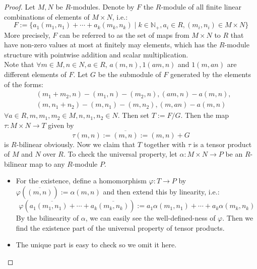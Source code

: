 \begin{proof}
    Let $M,N$ be $R$-modules. Denote by $F$ the $R$-module of all finite linear combinations of elements of $M\times N$, i.e.:
    $$F:= \{ a_1 (m_1,n_1) +\cdots+ a_k(m_k,n_k) \mid k \in \mathbb{N}_+,a_i\in R, (m_i,n_i) \in M \times N\}$$
    More precisely, $F$ can be referred to as the set of maps from $M\times N$ to $R$ that have non-zero values at most at finitely may elements, which has the $R$-module structure with pointwise addition and scalar multiplication.\\
    Note that $\forall m\in M,n\in N,a\in R$, $a(m,n),1(am,n)$ and $1(m,an)$ are different elements of $F$. Let $G$ be the submodule of $F$ generated by the elements of the forms:
    \begin{align*}
        &(m_1+m_2,n) - (m_1,n) -(m_2,n), (am,n)-a(m,n),\\
        &(m,n_1+n_2) - (m,n_1) -(m,n_2), (m,an)-a(m,n)
    \end{align*}
    $\forall a\in R,m,m_1,m_2 \in M, n,n_1,n_2\in N$. Then set $T:= F/G$. Then the map $\tau:M\times N \to T$ given by
    $$\tau(m,n) := \overline{(m,n)} := (m,n) +G $$
    is $R$-bilinear obviously. Now we claim that $T$ together with $\tau$ is a tensor product of $M$ and $N$ over $R$. To check the universal property, let $\alpha: M\times N \to P$ be an $R$-bilinear map to any $R$-module $P$. 
    \begin{itemize}
        \item For the existence, define a homomorphism $\varphi: T\to P$ by
        $\varphi (\overline{(m,n)}) := \alpha(m,n)$
        and then extend this by linearity, i.e.:
        $$\varphi (a_1\overline{(m_1,n_1)} + \cdots + a_k\overline{(m_k,n_k)}) := a_1\alpha(m_1,n_1) +\cdots+ a_k\alpha(m_k,n_k)$$
        By the bilinearity of $\alpha$, we can easily see the well-defined-ness of $\varphi$. Then we find the existence part of the universal property of tensor products.

        \item The unique part is easy to check so we omit it here.
    \end{itemize}
\end{proof}

